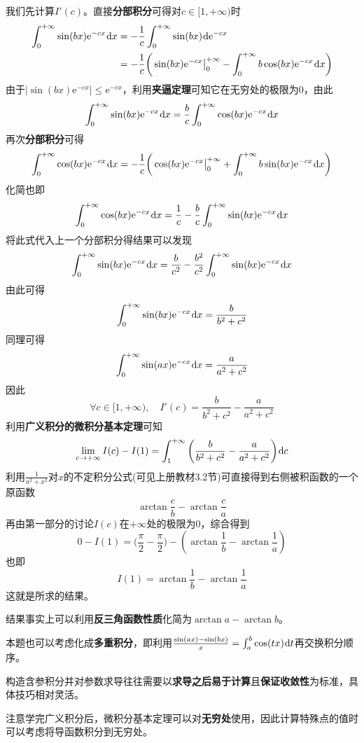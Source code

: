 \documentclass[a4paper,UTF8,fontset=windows,AutoFakeBold]{ctexart}
\newcommand*{\dr}{\hspace{0.07em}\mathrm{d}}
\newcommand*{\er}{\mathrm{e}}
\newcommand*{\note}{\noindent *}
\theoremstyle{ex}
\begin{document}
\begin{framed}
{\begin{itemize}
        我们先计算$I'(c)$。直接\textbf{分部积分}可得对$c\in[1,+\infty)$时
        $$\begin{aligned}\int_0^{+\infty}\sin(bx)\er^{-cx}\dr x&=-\frac{1}{c}\int_0^{+\infty}\sin(bx)\dr\er^{-cx}\\ &=-\frac{1}{c}\bigg(\sin(bx)\er^{-cx}\big|^{+\infty}_0-\int_0^{+\infty}b\cos(bx)\er^{-cx}\dr x\bigg)\end{aligned}$$
        由于$|\sin(bx)\er^{-cx}|\le\er^{-cx}$，利用\textbf{夹逼定理}可知它在无穷处的极限为0，由此
        $$\int_0^{+\infty}\sin(bx)\er^{-cx}\dr x=\frac{b}{c}\int_0^{+\infty}\cos(bx)\er^{-cx}\dr x$$
        再次\textbf{分部积分}可得
        $$\int_0^{+\infty}\cos(bx)\er^{-cx}\dr x=-\frac{1}{c}\bigg(\cos(bx)\er^{-cx}\big|^{+\infty}_0+\int_0^{+\infty}b\sin(bx)\er^{-cx}\dr x\bigg)$$
        化简也即
        $$\int_0^{+\infty}\cos(bx)\er^{-cx}\dr x=\frac{1}{c}-\frac{b}{c}\int_0^{+\infty}\sin(bx)\er^{-cx}\dr x$$
        将此式代入上一个分部积分得结果可以发现
        $$\int_0^{+\infty}\sin(bx)\er^{-cx}\dr x=\frac{b}{c^2}-\frac{b^2}{c^2}\int_0^{+\infty}\sin(bx)\er^{-cx}\dr x$$
        由此可得
        $$\int_0^{+\infty}\sin(bx)\er^{-cx}\dr x=\frac{b}{b^2+c^2}$$
        同理可得
        $$\int_0^{+\infty}\sin(ax)\er^{-cx}\dr x=\frac{a}{a^2+c^2}$$
        因此
        $$\forall c\in[1,+\infty),\quad I'(c)=\frac{b}{b^2+c^2}-\frac{a}{a^2+c^2}$$
        利用\textbf{广义积分的微积分基本定理}可知
        $$\lim_{c\to+\infty}I(c)-I(1)=\int_1^{+\infty}\bigg(\frac{b}{b^2+c^2}-\frac{a}{a^2+c^2}\bigg)\dr c$$
        利用$\frac{1}{a^2+x^2}$对$x$的不定积分公式(可见上册教材3.2节)可直接得到右侧被积函数的一个原函数
        $$\arctan\frac{c}{b}-\arctan\frac{c}{a}$$
        再由第一部分的讨论$I(c)$在$+\infty$处的极限为0，综合得到
        $$0-I(1)=\bigg(\frac{\pi}{2}-\frac{\pi}{2}\bigg)-(\arctan\frac{1}{b}-\arctan\frac{1}{a})$$
        也即
        $$I(1)=\arctan\frac{1}{b}-\arctan\frac{1}{a}$$
        这就是所求的结果。

        \note 结果事实上可以利用\textbf{反三角函数性质}化简为$\arctan a-\arctan b$。
    \end{itemize}
}
\end{framed}

\note 本题也可以考虑化成\textbf{多重积分}，即利用$\frac{\sin(ax)-\sin(bx)}{x}=\int_a^b\cos(tx)\dr t$再交换积分顺序。

\note 构造含参积分并对参数求导往往需要以\textbf{求导之后易于计算}且\textbf{保证收敛性}为标准，具体技巧相对灵活。

\note 注意学完广义积分后，微积分基本定理可以对\textbf{无穷处}使用，因此计算特殊点的值时可以考虑将导函数积分到无穷处。
\end{document}
